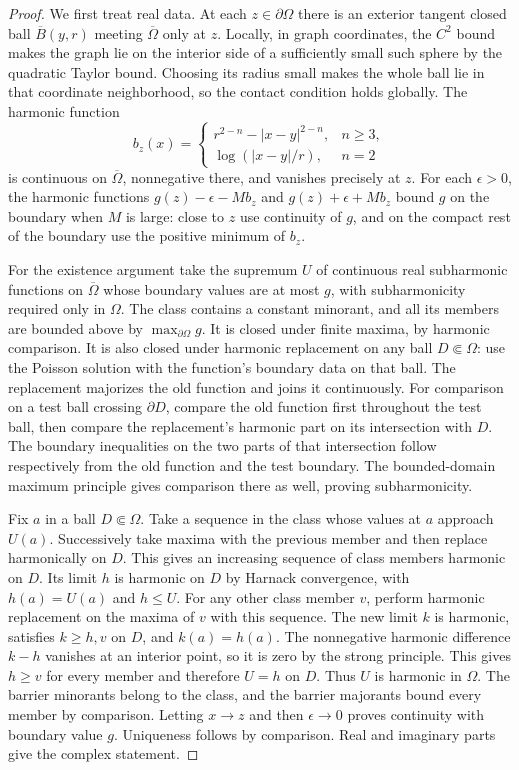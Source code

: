 \documentclass[11pt,oneside,openany]{book}
\theoremstyle{plain}
\theoremstyle{definition}
\theoremstyle{remark}
\begin{document}
\begin{proof}
We first treat real data. At each \(z\in\partial\Omega\)
there is an exterior tangent closed ball \(\overline B(y,r)\)
meeting \(\overline\Omega\) only at \(z\). Locally, in graph
coordinates, the \(C^2\) bound makes the graph lie on the
interior side of a sufficiently small such sphere by the
quadratic Taylor bound. Choosing its radius small makes the
whole ball lie in that coordinate neighborhood, so the contact
condition holds globally. The harmonic function
\[
 b_z(x)=
 \begin{cases}
  r^{2-n}-|x-y|^{2-n},&n\ge3,\\
  \log(|x-y|/r),&n=2
 \end{cases}
\]
is continuous on \(\overline\Omega\), nonnegative there,
and vanishes precisely at \(z\). For each \(\epsilon>0\),
the harmonic functions
\(g(z)-\epsilon-M b_z\) and \(g(z)+\epsilon+M b_z\)
bound \(g\) on the boundary when \(M\) is large: close to
\(z\) use continuity of \(g\), and on the compact rest of
the boundary use the positive minimum of \(b_z\).

For the existence argument take the supremum \(U\) of
continuous real subharmonic functions on \(\overline\Omega\)
whose boundary values are at most \(g\), with subharmonicity
required only in \(\Omega\). The class contains a constant
minorant, and all its members are bounded above by
\(\max_{\partial\Omega}g\). It is closed under finite
maxima, by harmonic comparison. It is also closed under
harmonic replacement on any ball \(D\Subset\Omega\):
use the Poisson solution with the function's boundary data
on that ball. The replacement majorizes the old function
and joins it continuously. For comparison on a test ball
crossing \(\partial D\), compare the old function first
throughout the test ball, then compare the replacement's
harmonic part on its intersection with \(D\).
The boundary inequalities on the two parts of that
intersection follow respectively from the old function and
the test boundary. The bounded-domain maximum principle
gives comparison there as well, proving subharmonicity.

Fix \(a\) in a ball \(D\Subset\Omega\). Take a sequence in
the class whose values at \(a\) approach \(U(a)\).
Successively take maxima with the previous member and then
replace harmonically on \(D\). This gives an increasing
sequence of class members harmonic on \(D\).
Its limit \(h\) is harmonic on \(D\) by Harnack convergence,
with \(h(a)=U(a)\) and \(h\le U\). For any other class
member \(v\), perform harmonic replacement on the maxima
of \(v\) with this sequence. The new limit \(k\) is harmonic,
satisfies \(k\ge h,v\) on \(D\), and \(k(a)=h(a)\).
The nonnegative harmonic difference \(k-h\) vanishes at an
interior point, so it is zero by the strong principle.
This gives \(h\ge v\) for every member and therefore
\(U=h\) on \(D\). Thus \(U\) is harmonic in \(\Omega\).
The barrier minorants belong to the class, and the barrier
majorants bound every member by comparison. Letting
\(x\to z\) and then \(\epsilon\to0\) proves continuity with
boundary value \(g\). Uniqueness follows by comparison.
Real and imaginary parts give the complex statement.


\end{proof}
\end{document}
